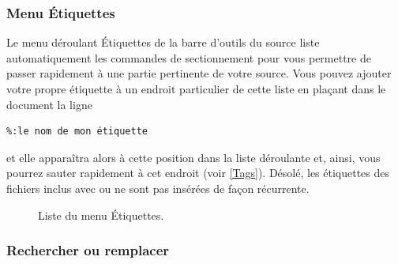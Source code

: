 \documentclass[11pt,french]{article}
\newcommand{\mnu}[1]{\textsf{#1}}
\begin{document}
\subsubsection{Menu Étiquettes}

Le menu déroulant \mnu{Étiquettes} de la barre d'outils du source liste automatiquement les commandes de sectionnement pour vous permettre de passer rapidement à une partie pertinente de votre source. Vous pouvez ajouter votre propre étiquette à un endroit particulier de cette liste en plaçant dans le document la ligne
\begin{verbatim}
%:le nom de mon étiquette
\end{verbatim}
et elle apparaîtra alors à cette position dans la liste déroulante et, ainsi, vous pourrez sauter rapidement à cet endroit (voir \vref{Tags}). Désolé, les étiquettes des fichiers inclus avec \verb|| ou \verb|| ne sont pas insérées de façon récurrente.

\begin{figure}
\centering
{}
\caption{Liste du menu Étiquettes.\label{Tags}}
\end{figure}

\subsubsection{Rechercher ou remplacer}
\end{document}
